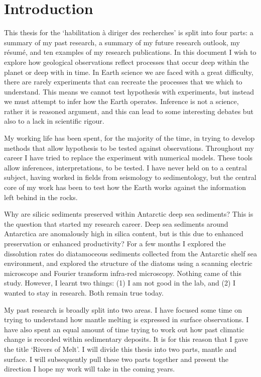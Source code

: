 \chapter{Introduction}

This thesis for the `habilitation à diriger des recherches' is split into four parts: a summary of my past research, a summary of my future research outlook, my résumé, and ten examples of my research publications. In this document I wish to explore how geological observations reflect processes that occur deep within the planet or deep with in time. In Earth science we are faced with a great difficulty, there are rarely experiments that can recreate the processes that we which to understand. This means we cannot test hypothesis with experiments, but instead we must attempt to infer how the Earth operates. Inference is not a science, rather it is reasoned argument, and this can lead to some interesting debates but also to a lack in scientific rigour.

My working life has been spent, for the majority of the time, in trying to develop methods that allow hypothesis to be tested against observations. Throughout my career I have tried to replace the experiment with numerical models. These tools allow inferences, interpretations, to be tested. I have never held on to a central subject, having worked in fields from seismology to sedimentology, but the central core of my work has been to test how the Earth works against the information left behind in the rocks.

Why are silicic sediments preserved within Antarctic deep sea sediments? This is the question that started my research career. Deep sea sediments around Antarctica are anomalously high in silica content, but is this due to enhanced preservation or enhanced productivity? For a few months I explored the dissolution rates do diatamoceous sediments collected from the Antarctic shelf sea environment, and explored the structure of the diatoms using a scanning electric microscope and Fourier transform infra-red microscopy. Nothing came of this study. However, I learnt two things: (1) I am not good in the lab, and (2) I wanted to stay in research. Both remain true today.

My past research is broadly split into two areas. I have focused some time on trying to understand how mantle melting is expressed in surface observations. I have also spent an equal amount of time trying to work out how past climatic change is recorded within sedimentary deposits. It is for this reason that I gave the title `Rivers of Melt'. I will divide this thesis into two parts, mantle and surface. I will subsequently pull these two parts together and present the direction I hope my work will take in the coming years.
